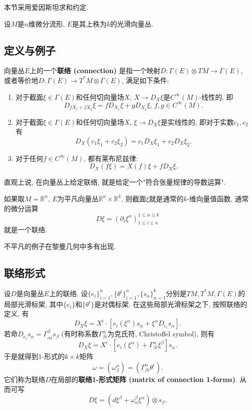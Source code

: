 
本节采用爱因斯坦求和约定.

设$M$是$n$维微分流形, $E$是其上秩为$k$的光滑向量丛. 

\subsection{定义与例子}
向量丛$E$上的一个\textbf{联络 (connection) }是指一个映射$D:\Gamma(E)\otimes TM\to\Gamma(E)$, 或者等价地$D:\Gamma(E)\to T^*M\otimes\Gamma(E)$, 满足如下条件:

\begin{enumerate}
\item 对于截面$\xi\in\Gamma(E)$和任何切向量场$X$, $X\to D_X\xi$是$C^\infty(M)$-线性的, 即
$$
D_{fX_1+fX_2}\xi=fD_{X_1}\xi+gD_{X_2}\xi,\,f,g\in C^\infty(M).
$$
\item 对于截面$\xi\in\Gamma(E)$和任何切向量场$X$, $\xi\to D_X\xi$是实线性的, 即对于实数$c_1,c_2$有
$$
D_X(c_1\xi_1+c_2\xi_2)=c_1D_X\xi_1+c_2D_X\xi_2.
$$
\item 对于任何$f\in C^\infty(M)$, 都有莱布尼兹律:
$$
D_X(f\xi)=X(f)\xi+fD_X\xi.
$$
\end{enumerate}

直观上说, 在向量丛上给定联络, 就是给定一个"符合张量规律的导数运算". 

如果取$M=\mathbb{R}^n$, $E$为平凡向量丛$\mathbb{R}^n\times\mathbb{R}^k$, 则截面$\xi$就是通常的$k$-维向量值函数, 通常的微分运算
$$
D\xi=(\partial_i\xi^\alpha)_{1\leq i\leq n}^{1\leq\alpha\leq k}
$$
就是一个联络.

不平凡的例子在黎曼几何中多有出现.

\subsection{联络形式}
设$D$是向量丛$E$上的联络. 设$\{e_i\}_{i=1}^n,\{\theta^i\}_{i=1}^n,\{s_\alpha\}_{\alpha=1}^k$分别是$TM,T^*M,\Gamma(E)$的局部光滑标架, 其中$\{e_i\}$和$\{\theta^i\}$是对偶标架. 在这些局部光滑标架之下, 按照联络的定义, 有
$$
D_X\xi=X^i\cdot\left[e_i(\xi^\alpha)s_\alpha+\xi^\alpha D_{e_i}s_\alpha\right].
$$
若命$D_{e_i}s_\alpha=\Gamma_{\alpha i}^\beta s_\beta$ (有时称系数$\Gamma^\alpha_{\beta i}$为克氏符, Christoffel symbol), 则有
$$
D_X\xi=X^i\cdot\left[e_i(\xi^\alpha)+\Gamma_{\beta i}^\alpha\xi^\beta \right]s_\alpha.
$$
于是就得到1-形式的$k\times k$矩阵
$$
\omega=(\omega_\beta^\alpha)=(\Gamma_{\beta i}^\alpha\theta^i).
$$
它们称为联络$D$在局部的\textbf{联络1-形式矩阵 (matrix of connection 1-forms)}. 从而可写
$$
D\xi=(d\xi^\beta+\omega_\alpha^\beta\xi^\alpha)\otimes s_\beta.
$$

